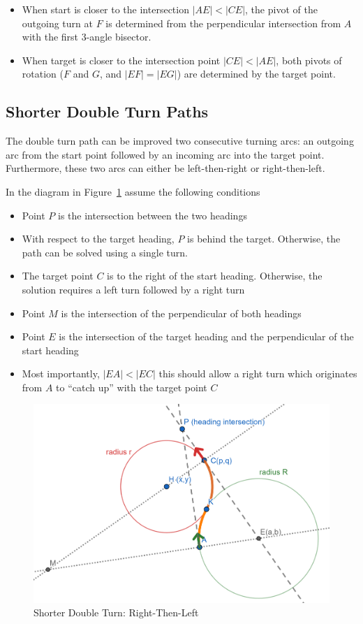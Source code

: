 \documentclass{article}
\begin{document}
\begin{itemize}
  \item When start is closer to the intersection $|AE| < |CE|$, the pivot of the
  outgoing turn at $F$ is determined from the perpendicular intersection from $A$
  with the first 3-angle bisector.
  \item When target is closer to the intersection point $|CE| < |AE|$, both
  pivots of rotation ($F$ and $G$, and $|EF| = |EG|$) are determined by the target point.
\end{itemize}

\subsection*{Shorter Double Turn Paths}
The double turn path can be improved two consecutive turning arcs: an outgoing arc from the start point
followed by an incoming arc into the target point. Furthermore, these two arcs can either be 
left-then-right or right-then-left.

In the diagram in Figure~\ref{fig:double-RL} assume the following conditions
\begin{itemize}
  \item Point $P$ is the intersection between the two headings
  \item With respect to the target heading, $P$ is behind the target. Otherwise, the path
  can be solved using a single turn.
  \item The target point $C$ is to the right of the start heading. Otherwise, the solution requires
  a left turn followed by a right turn
  \item Point $M$ is the intersection of the perpendicular of both headings
  \item Point $E$ is the intersection of the target heading and the perpendicular of the start heading
  \item Most importantly, $|EA| < |EC|$ this should allow a right turn which originates from $A$ to ``catch up''
  with the target point $C$
\end{itemize}

\begin{figure}[hbt]
\includegraphics[width=12cm]{screenshots/double-turns-right-left.png}
\caption{Shorter Double Turn: Right-Then-Left}
\label{fig:double-RL}
\end{figure}
\end{document}
